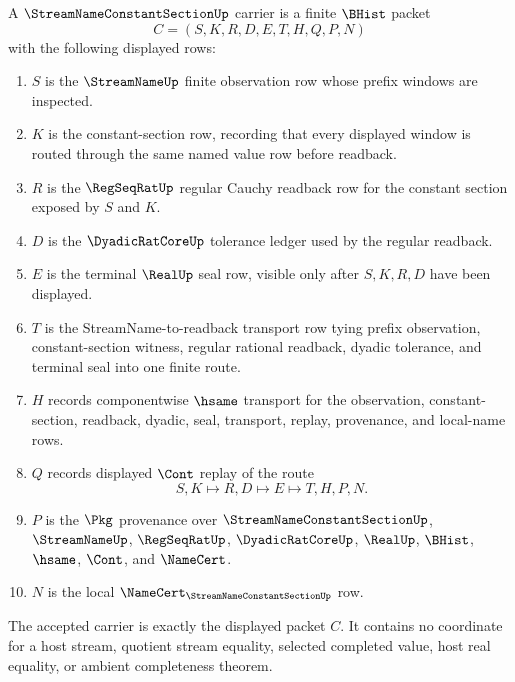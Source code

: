 \begin{definition}
\label{def:streamname-constant-section-carrier}
A $\StreamNameConstantSectionUp$ carrier is a finite $\BHist$ packet
$$
C=(S,K,R,D,E,T,H,Q,P,N)
$$
with the following displayed rows:
\begin{enumerate}
\item $S$ is the $\StreamNameUp$ finite observation row whose prefix windows are inspected.
\item $K$ is the constant-section row, recording that every displayed window is routed through the same named value row before readback.
\item $R$ is the $\RegSeqRatUp$ regular Cauchy readback row for the constant section exposed by $S$ and $K$.
\item $D$ is the $\DyadicRatCoreUp$ tolerance ledger used by the regular readback.
\item $E$ is the terminal $\RealUp$ seal row, visible only after $S,K,R,D$ have been displayed.
\item $T$ is the StreamName-to-readback transport row tying prefix observation, constant-section witness, regular rational readback, dyadic tolerance, and terminal seal into one finite route.
\item $H$ records componentwise $\hsame$ transport for the observation, constant-section, readback, dyadic, seal, transport, replay, provenance, and local-name rows.
\item $Q$ records displayed $\Cont$ replay of the route
$$
S,K \longmapsto R,D \longmapsto E \longmapsto T,H,P,N .
$$
\item $P$ is the $\Pkg$ provenance over $\StreamNameConstantSectionUp$, $\StreamNameUp$, $\RegSeqRatUp$, $\DyadicRatCoreUp$, $\RealUp$, $\BHist$, $\hsame$, $\Cont$, and $\NameCert$.
\item $N$ is the local $\NameCert_{\StreamNameConstantSectionUp}$ row.
\end{enumerate}
The accepted carrier is exactly the displayed packet $C$. It contains no coordinate for a host stream, quotient stream equality, selected completed value, host real equality, or ambient completeness theorem.
\end{definition}

